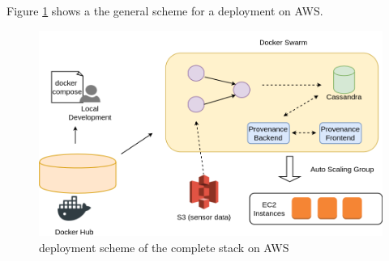Figure \ref{fig:finaldeployment} shows a the general scheme for a deployment on AWS.

\begin{figure}[h!]
	\includegraphics[width=\textwidth]{figures/deployment2.png}
	\caption{deployment scheme of the complete stack on AWS}
	\label{fig:finaldeployment}
\end{figure}